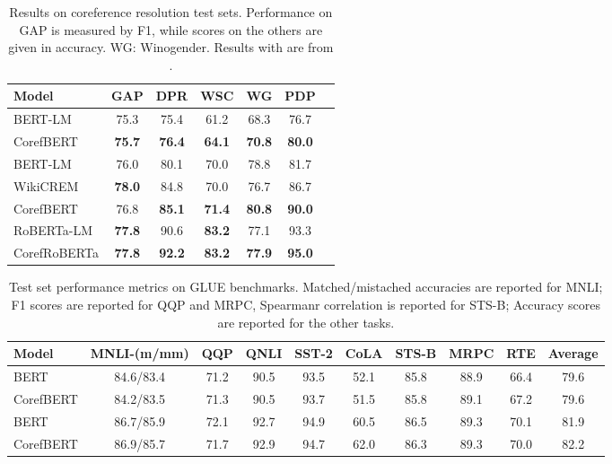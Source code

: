 \documentclass[11pt,a4paper]{article}
\newcommand\BASESIZE{\xspace}
\newcommand\LARGESIZE{\xspace}
\begin{document}
\begin{table}[!t]
\small
\centering
\begin{tabular}{l c c c c c c}
\toprule
{Model}  & GAP & DPR  & WSC  & WG & PDP \\
\midrule
BERT-LM\BASESIZE & 75.3 & 75.4 & 61.2   &  68.3 & 76.7 \\
CorefBERT\BASESIZE & \bf{75.7} &  \bf{76.4} & \bf{64.1}&  \bf{70.8}  & \bf{80.0}\\
\midrule
BERT-LM\LARGESIZE  & 76.0 & 80.1 & 70.0   &  78.8 & 81.7 \\
WikiCREM\LARGESIZE & \bf{78.0} & {84.8} & 70.0 & 76.7  & {86.7}\\
CorefBERT\LARGESIZE & 76.8 &  \bf{85.1}& \bf{71.4}&  \bf{80.8}  & \bf{90.0}\\
\midrule
RoBERTa-LM\LARGESIZE  & \bf{77.8} & 90.6 & \bf{83.2}   &  77.1 & 93.3 \\
CorefRoBERTa\LARGESIZE & \bf{77.8} &  \bf{92.2}& \bf{83.2}&  \bf{77.9}  & \bf{95.0}\\
\bottomrule
\end{tabular}
\caption{Results on coreference resolution test sets. Performance on GAP is measured by F1, while scores on the others are given in accuracy.  WG: Winogender. Results with  are from \citet{wikicrem}. }
\label{tab:Coref_result}
\end{table}


\begin{table*}[!t]
\small
\centering
\begin{tabular}{l c c c c c c c c c}
\toprule

Model &   MNLI-(m/mm)  & QQP & QNLI & SST-2 & CoLA & STS-B & MRPC & RTE & Average \\
\midrule
BERT\BASESIZE &  84.6/83.4 &71.2  & 90.5 & 93.5  & 52.1 & 85.8 &88.9 & 66.4 & 79.6\\
CorefBERT\BASESIZE &  84.2/83.5 &71.3  & 90.5 & 93.7  &51.5 & 85.8 &89.1 & 67.2 & 79.6\\
\midrule
BERT\LARGESIZE &   86.7/85.9  &72.1  & 92.7 & 94.9  & 60.5 & 86.5 &89.3 & 70.1 & 81.9\\
CorefBERT\LARGESIZE &  86.9/85.7 &71.7  & 92.9 & 94.7  & 62.0 & 86.3 & 89.3 & 70.0 & 82.2\\
\bottomrule
\end{tabular}
\caption{Test set performance metrics on GLUE benchmarks. 
Matched/mistached accuracies are reported for MNLI; F1 scores are reported for QQP and MRPC, Spearmanr correlation is reported for STS-B; Accuracy scores are reported for the other tasks.} 
\label{tab:GLUE_result}  
\end{table*}
\end{document}
